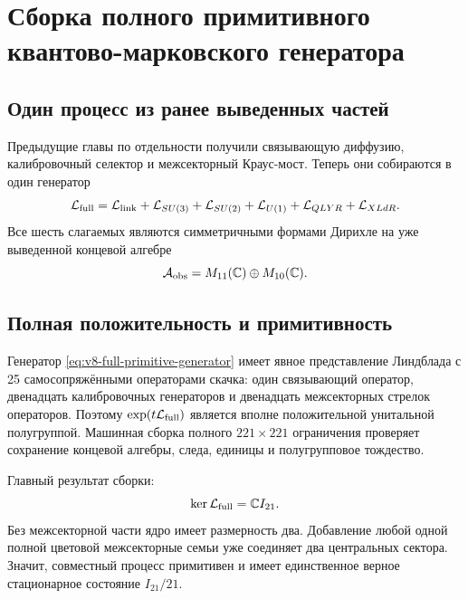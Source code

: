 \chapter{Сборка полного примитивного квантово-марковского генератора}
\label{ch:v8-full-primitive-markov-generator-assembly-gate}

\section{Один процесс из ранее выведенных частей}

Предыдущие главы по отдельности получили связывающую диффузию, калибровочный селектор
и межсекторный Краус-мост. Теперь они собираются в один генератор
\begin{equation}
 \mathcal L_{\rm full}
 =\mathcal L_{\rm link}
 +\mathcal L_{SU(3)}
 +\mathcal L_{SU(2)}
 +\mathcal L_{U(1)}
 +\mathcal L_{QLYR}
 +\mathcal L_{XLdR}.
 \label{eq:v8-full-primitive-generator}
\end{equation}
Все шесть слагаемых являются симметричными формами Дирихле на уже
выведенной концевой алгебре
\begin{equation}
 \mathcal A_{\rm obs}=M_{11}(\mathbb C)\oplus M_{10}(\mathbb C).
\end{equation}

\section{Полная положительность и примитивность}

Генератор \eqref{eq:v8-full-primitive-generator} имеет явное представление
Линдблада с 25 самосопряжёнными операторами скачка: один связывающий оператор,
двенадцать калибровочных генераторов и двенадцать межсекторных стрелок операторов. Поэтому
$\exp(t\mathcal L_{\rm full})$ является вполне положительной унитальной
полугруппой. Машинная сборка полного $221\times221$ ограничения проверяет
сохранение концевой алгебры, следа, единицы и полугрупповое тождество.

Главный результат сборки:
\begin{equation}
 \ker\mathcal L_{\rm full}=\mathbb CI_{21}.
 \label{eq:v8-full-generator-scalar-kernel}
\end{equation}
Без межсекторной части ядро имеет размерность два. Добавление любой одной полной
цветовой межсекторные семьи уже соединяет два центральных сектора. Значит,
совместный процесс примитивен и имеет единственное верное стационарное
состояние $I_{21}/21$.

